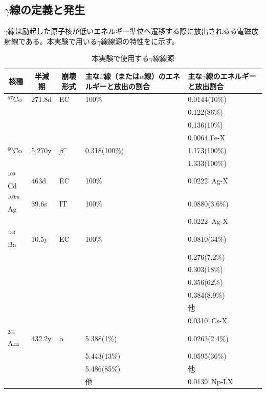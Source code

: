 %

\subsection{$\gamma$線の定義と発生}
$\gamma$線は励起した原子核が低いエネルギー準位へ遷移する際に放出されるる電磁放射線である。本実験で用いる$\gamma$線線源の特性をに示す。

\begin{table}[H]
\begin{center}
\begin{tabular}{|l|l|l|l|l|} \hline
\multicolumn{1}{|c|}{核種} & \multicolumn{1}{c|}{半減期} & \multicolumn{1}{c|}{崩壊形式} &\parbox{12zw}{主な$\beta$線（または$\alpha$線）のエネルギーと放出の割合} & \parbox{10zw}{主な$\gamma$線のエネルギーと放出割合} \\\hline
$^{57}$Co & 271.8d & EC & 100$\%$ & 0.0144(10\%) \\
 &  &  &  & 0.122(86\%) \\
 &  &  &  & 0.136(10\%) \\
 &  &  &  & 0.0064 Fe-X \\\hline
$^{60}$Co & 5.270y & $\beta^{-}$ & 0.318(100\%) & 1.173(100\%) \\
 &  &  &  & 1.333(100\%) \\\hline
$^{109}$Cd & 463d & EC & 100\% & 0.0222\ Ag-X \\
$^{109m}$Ag & 39.6s & IT & 100\% & 0.0880(3.6\%) \\
 &  &  &  & 0.0222\ Ag-X \\\hline
$^{133}$Ba & 10.5y & EC & 100\% & 0.0810(34\%) \\
 &  &  &  & 0.276(7.2\%) \\
 &  &  &  & 0.303(18\%) \\
 &  &  &  & 0.356(62\%) \\
 &  &  &  & 0.384(8.9\%) \\
 &  &  &  & 他 \\
 &  &  &  & 0.0310\ Cs-X \\\hline
$^{241}$Am & 432.2y & $\alpha$ & 5.388(1\%) & 0.0263(2.4\%) \\
 &  &  & 5.443(13\%) & 0.0595(36\%) \\
 &  &  & 5.486(85\%) & 他 \\
 &  &  & 他 & 0.0139\ Np-LX \\\hline
\end{tabular}
\end{center}
\caption{本実験で使用する$\gamma$線線源\cite{RI}}
\label{RI}
\end{table}

